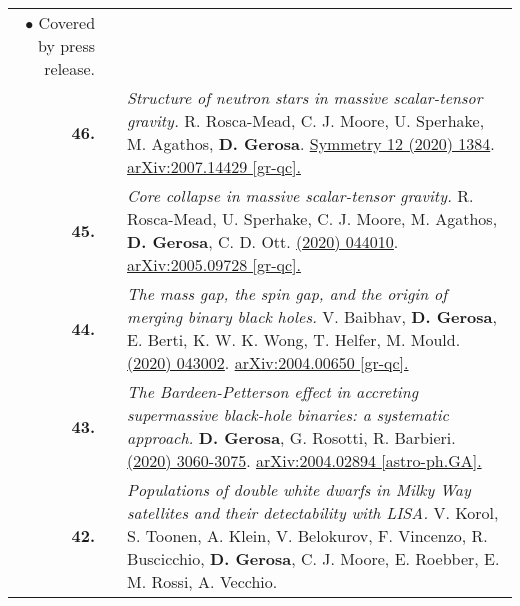 {\begin{longtable}{rp{0.3cm}p{15.8cm}}
\textcolor{color1}{$\bullet$} Covered by press release.
\vspace{0.09cm}\\
%
\textbf{46.} & & \textit{Structure of neutron stars in massive scalar-tensor gravity.}
\newline{}
R. Rosca-Mead, C. J. Moore, U. Sperhake, M. Agathos, \textbf{D. Gerosa}.
\newline{}
\href{https://www.mdpi.com/2073-8994/12/9/1384}{Symmetry 12 (2020) 1384}. \href{https://arxiv.org/abs/2007.14429}{arXiv:2007.14429 [gr-qc].}
\vspace{0.09cm}\\
%
\textbf{45.} & & \textit{Core collapse in massive scalar-tensor gravity.}
\newline{}
R. Rosca-Mead, U. Sperhake, C. J. Moore, M. Agathos, \textbf{D. Gerosa}, C. D. Ott.
\newline{}
\href{https://journals.aps.org/prd/abstract/10.1103/PhysRevD.102.044010}{\prd 102 (2020) 044010}. \href{https://arxiv.org/abs/2005.09728}{arXiv:2005.09728 [gr-qc].}
\vspace{0.09cm}\\
%
\textbf{44.} & & \textit{The mass gap, the spin gap, and the origin of merging binary black holes.}
\newline{}
V. Baibhav, \textbf{D. Gerosa}, E. Berti, K. W. K. Wong, T. Helfer, M. Mould.
\newline{}
\href{https://journals.aps.org/prd/abstract/10.1103/PhysRevD.102.043002}{\prd 102 (2020) 043002}. \href{https://arxiv.org/abs/2004.00650}{arXiv:2004.00650 [gr-qc].}
\vspace{0.09cm}\\
%
\textbf{43.} & & \textit{The Bardeen-Petterson effect in accreting supermassive black-hole binaries: a systematic approach.}
\newline{}
\textbf{D. Gerosa}, G. Rosotti, R. Barbieri.
\newline{}
\href{https://doi.org/10.1093/mnras/staa1693}{\mnras 496 (2020) 3060-3075}. \href{https://arxiv.org/abs/2004.02894}{arXiv:2004.02894 [astro-ph.GA].}
\vspace{0.09cm}\\
%
\textbf{42.} & & \textit{Populations of double white dwarfs in Milky Way satellites and their detectability with LISA.}
\newline{}
V. Korol, S. Toonen, A. Klein, V. Belokurov, F. Vincenzo, R. Buscicchio, \textbf{D. Gerosa}, C. J. Moore, E. Roebber, E. M. Rossi, A. Vecchio.
\newline{}

\end{longtable}}
